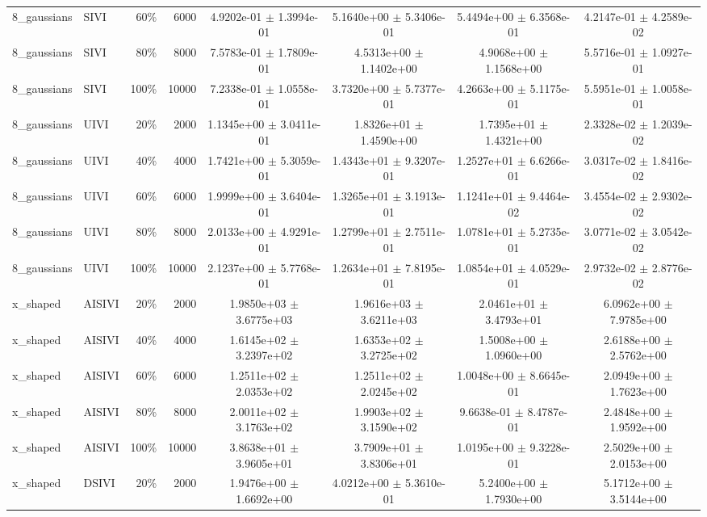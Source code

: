 \begin{tabular}{llrrcccc}
8\_gaussians & SIVI & 60\% & 6000 & 4.9202e-01 $\pm$ 1.3994e-01 & 5.1640e+00 $\pm$ 5.3406e-01 & 5.4494e+00 $\pm$ 6.3568e-01 & 4.2147e-01 $\pm$ 4.2589e-02 \\
8\_gaussians & SIVI & 80\% & 8000 & 7.5783e-01 $\pm$ 1.7809e-01 & 4.5313e+00 $\pm$ 1.1402e+00 & 4.9068e+00 $\pm$ 1.1568e+00 & 5.5716e-01 $\pm$ 1.0927e-01 \\
8\_gaussians & SIVI & 100\% & 10000 & 7.2338e-01 $\pm$ 1.0558e-01 & 3.7320e+00 $\pm$ 5.7377e-01 & 4.2663e+00 $\pm$ 5.1175e-01 & 5.5951e-01 $\pm$ 1.0058e-01 \\
8\_gaussians & UIVI & 20\% & 2000 & 1.1345e+00 $\pm$ 3.0411e-01 & 1.8326e+01 $\pm$ 1.4590e+00 & 1.7395e+01 $\pm$ 1.4321e+00 & 2.3328e-02 $\pm$ 1.2039e-02 \\
8\_gaussians & UIVI & 40\% & 4000 & 1.7421e+00 $\pm$ 5.3059e-01 & 1.4343e+01 $\pm$ 9.3207e-01 & 1.2527e+01 $\pm$ 6.6266e-01 & 3.0317e-02 $\pm$ 1.8416e-02 \\
8\_gaussians & UIVI & 60\% & 6000 & 1.9999e+00 $\pm$ 3.6404e-01 & 1.3265e+01 $\pm$ 3.1913e-01 & 1.1241e+01 $\pm$ 9.4464e-02 & 3.4554e-02 $\pm$ 2.9302e-02 \\
8\_gaussians & UIVI & 80\% & 8000 & 2.0133e+00 $\pm$ 4.9291e-01 & 1.2799e+01 $\pm$ 2.7511e-01 & 1.0781e+01 $\pm$ 5.2735e-01 & 3.0771e-02 $\pm$ 3.0542e-02 \\
8\_gaussians & UIVI & 100\% & 10000 & 2.1237e+00 $\pm$ 5.7768e-01 & 1.2634e+01 $\pm$ 7.8195e-01 & 1.0854e+01 $\pm$ 4.0529e-01 & 2.9732e-02 $\pm$ 2.8776e-02 \\
x\_shaped & AISIVI & 20\% & 2000 & 1.9850e+03 $\pm$ 3.6775e+03 & 1.9616e+03 $\pm$ 3.6211e+03 & 2.0461e+01 $\pm$ 3.4793e+01 & 6.0962e+00 $\pm$ 7.9785e+00 \\
x\_shaped & AISIVI & 40\% & 4000 & 1.6145e+02 $\pm$ 3.2397e+02 & 1.6353e+02 $\pm$ 3.2725e+02 & 1.5008e+00 $\pm$ 1.0960e+00 & 2.6188e+00 $\pm$ 2.5762e+00 \\
x\_shaped & AISIVI & 60\% & 6000 & 1.2511e+02 $\pm$ 2.0353e+02 & 1.2511e+02 $\pm$ 2.0245e+02 & 1.0048e+00 $\pm$ 8.6645e-01 & 2.0949e+00 $\pm$ 1.7623e+00 \\
x\_shaped & AISIVI & 80\% & 8000 & 2.0011e+02 $\pm$ 3.1763e+02 & 1.9903e+02 $\pm$ 3.1590e+02 & 9.6638e-01 $\pm$ 8.4787e-01 & 2.4848e+00 $\pm$ 1.9592e+00 \\
x\_shaped & AISIVI & 100\% & 10000 & 3.8638e+01 $\pm$ 3.9605e+01 & 3.7909e+01 $\pm$ 3.8306e+01 & 1.0195e+00 $\pm$ 9.3228e-01 & 2.5029e+00 $\pm$ 2.0153e+00 \\
x\_shaped & DSIVI & 20\% & 2000 & 1.9476e+00 $\pm$ 1.6692e+00 & 4.0212e+00 $\pm$ 5.3610e-01 & 5.2400e+00 $\pm$ 1.7930e+00 & 5.1712e+00 $\pm$ 3.5144e+00 \\

\end{tabular}
